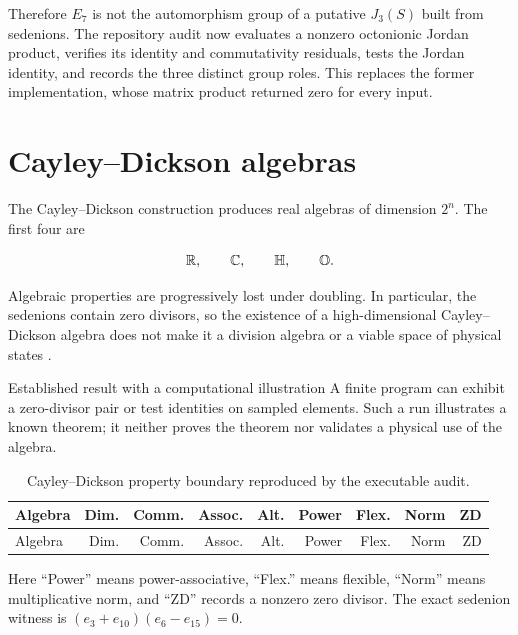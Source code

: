 Therefore $E_7$ is not the automorphism group of a putative $J_3(S)$ built
from sedenions. The repository audit now evaluates a nonzero octonionic Jordan
product, verifies its identity and commutativity residuals, tests the Jordan
identity, and records the three distinct group roles. This replaces the former
implementation, whose matrix product returned zero for every input.

\section{Cayley--Dickson algebras}

The Cayley--Dickson construction produces real algebras of dimension $2^n$.
The first four are

\begin{equation}
  \mathbb{R},
  \qquad
  \mathbb{C},
  \qquad
  \mathbb{H},
  \qquad
  \mathbb{O}.
\end{equation}

Algebraic properties are progressively lost under doubling. In particular,
the sedenions contain zero divisors, so the existence of a high-dimensional
Cayley--Dickson algebra does not make it a division algebra or a viable space
of physical states \citep{baez2001octonions,schafer1954composition}.

\begin{evidence}{Established result with a computational illustration}
A finite program can exhibit a zero-divisor pair or test identities on sampled
elements. Such a run illustrates a known theorem; it neither proves the theorem
nor validates a physical use of the algebra.
\end{evidence}

\scriptsize
\begin{longtable}{lrrrrrrrr}
  \caption{Cayley--Dickson property boundary reproduced by the executable audit.}
  \label{tab:cayley-property-boundary}\\
  \toprule
  Algebra & Dim. & Comm. & Assoc. & Alt. & Power & Flex. & Norm & ZD \\
  \midrule
  \endfirsthead
  \toprule
  Algebra & Dim. & Comm. & Assoc. & Alt. & Power & Flex. & Norm & ZD \\
  \midrule
  \endhead
  
\end{longtable}
\normalsize

Here ``Power'' means power-associative, ``Flex.'' means flexible, ``Norm''
means multiplicative norm, and ``ZD'' records a nonzero zero divisor. The exact
sedenion witness is $(e_3+e_{10})(e_6-e_{15})=0$.

